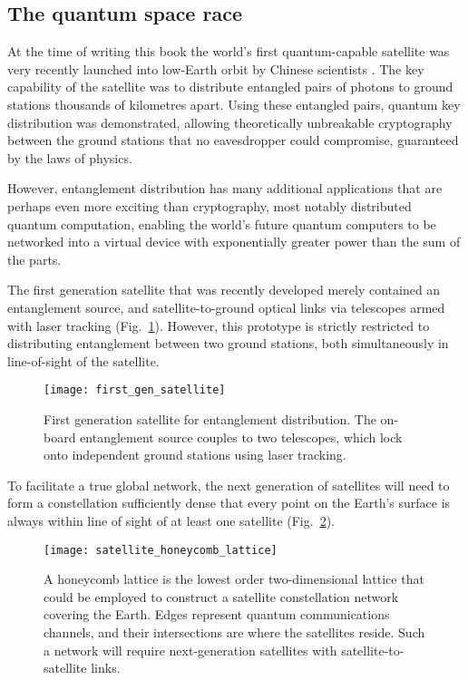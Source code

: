 %
%

\subsection{The quantum space race}\label{sec:quant_space_race_essay}

At the time of writing this book the world's first quantum-capable satellite was very recently launched into low-Earth orbit by Chinese scientists \cite{JWP}. The key capability of the satellite was to distribute entangled pairs of photons to ground stations thousands of kilometres apart. Using these entangled pairs, quantum key distribution was demonstrated, allowing theoretically unbreakable cryptography between the ground stations that no eavesdropper could compromise, guaranteed by the laws of physics.

However, entanglement distribution has many additional applications that are perhaps even more exciting than cryptography, most notably distributed quantum computation, enabling the world's future quantum computers to be networked into a virtual device with exponentially greater power than the sum of the parts.

The first generation satellite that was recently developed merely contained an entanglement source, and satellite-to-ground optical links via telescopes armed with laser tracking (Fig.~\ref{fig:first_gen_sat}). However, this prototype is strictly restricted to distributing entanglement between two ground stations, both simultaneously in line-of-sight of the satellite.

\begin{figure}[!htb]
\texttt{[image: first\_gen\_satellite]}
\caption{First generation satellite for entanglement distribution. The on-board entanglement source couples to two telescopes, which lock onto independent ground stations using laser tracking.}\label{fig:first_gen_sat}	
\end{figure}

To facilitate a true global network, the next generation of satellites will need to form a constellation sufficiently dense that every point on the Earth's surface is always within line of sight of at least one satellite (Fig.~\ref{fig:sat_honeycomb}).

\begin{figure}[!htb]
\texttt{[image: satellite\_honeycomb\_lattice]}
\caption{A honeycomb lattice is the lowest order two-dimensional lattice that could be employed to construct a satellite constellation network covering the Earth. Edges represent quantum communications channels, and their intersections are where the satellites reside. Such a network will require next-generation satellites with satellite-to-satellite links.}\label{fig:sat_honeycomb}	
\end{figure}

